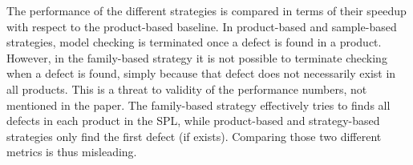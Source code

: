 \documentclass[11pt]{article}
\begin{document}
The performance of the different strategies is compared in terms of their speedup with respect to the product-based baseline. In product-based and sample-based strategies, model checking is terminated once a defect is found in a product. However, in the family-based strategy it is not possible to terminate checking when a defect is found, simply because that defect does not necessarily exist in all products. This is a threat to validity of the performance numbers, not mentioned in the paper. The family-based strategy effectively tries to finds all defects in each product in the SPL, while product-based and strategy-based strategies only find the first defect (if exists). Comparing those two different metrics is thus misleading.


 
\end{document}
